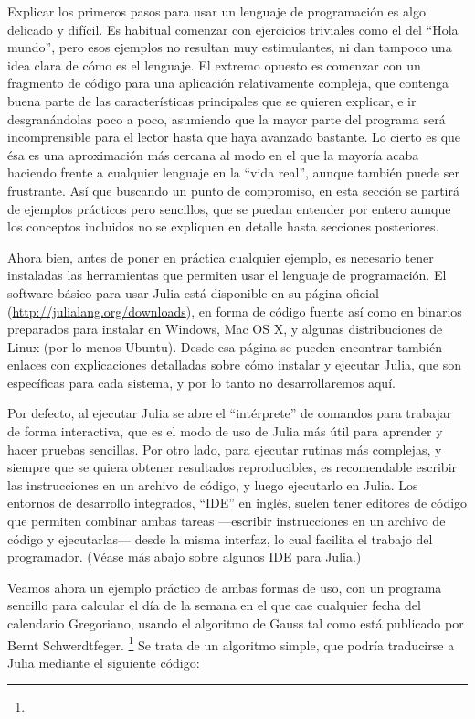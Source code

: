 ﻿\documentclass{article}
\begin{document}
Explicar los primeros pasos para usar un lenguaje de programación es algo delicado y difícil. Es habitual comenzar con ejercicios triviales como el del ``Hola mundo'', pero esos ejemplos no resultan muy estimulantes, ni dan tampoco una idea clara de cómo es el lenguaje. El extremo opuesto es comenzar con un fragmento de código para una aplicación relativamente compleja, que contenga buena parte de las características principales que se quieren explicar, e ir desgranándolas poco a poco, asumiendo que la mayor parte del programa será incomprensible para el lector hasta que haya avanzado bastante. Lo cierto es que ésa es una aproximación más cercana al modo en el que la mayoría acaba haciendo frente a cualquier lenguaje en la ``vida real'', aunque también puede ser frustrante. Así que buscando un punto de compromiso, en esta sección se partirá de ejemplos prácticos pero sencillos, que se puedan entender por entero aunque los conceptos incluidos no se expliquen en detalle hasta secciones posteriores.

Ahora bien, antes de poner en práctica cualquier ejemplo, es necesario tener instaladas las herramientas que permiten usar el lenguaje de programación. El software básico para usar Julia está disponible en su página oficial (\url{http://julialang.org/downloads}), en forma de código fuente así como en binarios preparados para instalar en Windows, Mac OS X, y algunas distribuciones de Linux (por lo menos Ubuntu). Desde esa página se pueden encontrar también enlaces con explicaciones detalladas sobre cómo instalar y ejecutar Julia, que son específicas para cada sistema, y por lo tanto no desarrollaremos aquí.

Por defecto, al ejecutar Julia se abre el ``intérprete'' de comandos para trabajar de forma interactiva, que es el modo de uso de Julia más útil para aprender y hacer pruebas sencillas. Por otro lado, para ejecutar rutinas más complejas, y siempre que se quiera obtener resultados reproducibles, es recomendable escribir las instrucciones en un archivo de código, y luego ejecutarlo en Julia. Los entornos de desarrollo integrados, ``IDE'' en inglés, suelen tener editores de código que permiten combinar ambas tareas ---escribir instrucciones en un archivo de código y ejecutarlas--- desde la misma interfaz, lo cual facilita el trabajo del programador. (Véase más abajo sobre algunos IDE para Julia.)

Veamos ahora un ejemplo práctico de ambas formas de uso, con un programa sencillo para calcular el día de la semana en el que cae cualquier fecha del calendario Gregoriano, usando el algoritmo de Gauss tal como está publicado por Bernt Schwerdtfeger.%
\footnote{%
%
} Se trata de un algoritmo simple, que podría traducirse a Julia mediante el siguiente código: 
\end{document}
